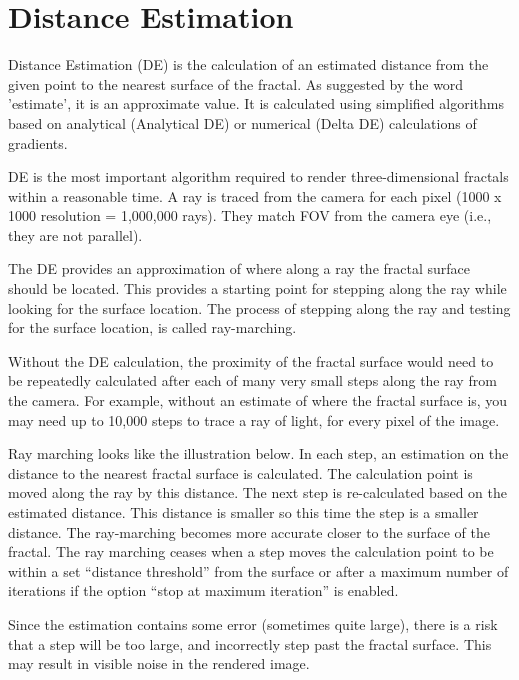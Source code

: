 \section{Distance Estimation}\label{distance-estimation}

Distance Estimation (DE) is the calculation of an estimated distance from the
given point to the nearest surface of the fractal. As suggested by the word
'estimate', it is an approximate value. It is calculated using simplified
algorithms based on analytical (Analytical DE) or numerical (Delta DE)
calculations of gradients.

DE is the most important algorithm required to render three-dimensional fractals
within a reasonable time.  A ray is traced from the camera for each pixel (1000 x 1000 resolution = 1,000,000 rays). They match FOV from the camera eye (i.e., they are not
parallel).

The DE provides an approximation of where along a ray the fractal surface should be located. This provides a starting point for stepping along the ray while looking for the surface location.
The process of stepping along the ray and testing for the surface location, is called ray-marching.

Without the DE calculation, the proximity of the fractal surface would need to be repeatedly calculated after each of many very small steps along the ray from the camera. For example, without an estimate of where the fractal surface is, you may need up to 10,000 steps to trace a ray of light, for every pixel of the image.

Ray marching looks like the illustration below. In each step, an estimation on
the distance to the nearest fractal surface is calculated. The calculation point is moved
along the ray by this distance. The next step is re-calculated based on the
estimated distance. This distance is smaller so this time the step is a
smaller distance. The ray-marching becomes more accurate closer to the surface
of the fractal. The ray marching ceases when a step moves the calculation point to be within a set
``distance threshold'' from the surface or after a maximum number of iterations
if the option ``stop at maximum iteration'' is enabled.

Since the estimation contains some error (sometimes quite large), there is a risk that a step will be too large, and incorrectly step past the fractal surface. This may result in visible noise in the rendered image.

